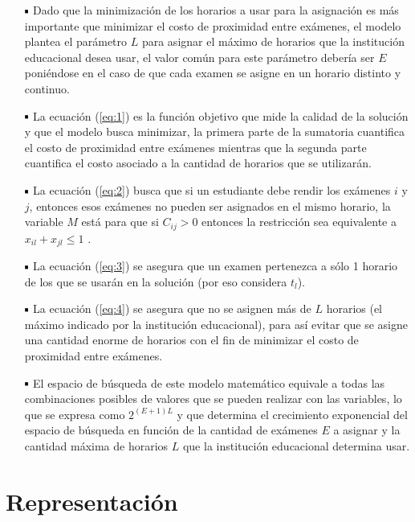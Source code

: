 \documentclass[letter, 10pt]{article}
\newcommand*\sq{\mathbin{\vcenter{\hbox{\rule{.7ex}{.7ex}}}}}
\begin{document}
\begin{itemize}
	\item[$\sq$] Dado que la minimización de los horarios a usar para la asignación es más importante que minimizar el costo de proximidad entre exámenes, el modelo plantea el parámetro $L$ para asignar el máximo de horarios que la institución educacional desea usar, el valor común para este parámetro debería ser $E$ poniéndose en el caso de que cada examen se asigne en un horario distinto y continuo.

	\item[$\sq$] La ecuación (\ref{eq:1}) es la función objetivo que mide la calidad de la solución y que el modelo busca minimizar, la primera parte de la sumatoria cuantifica el costo de proximidad entre exámenes mientras que la segunda parte cuantifica el costo asociado a la cantidad de horarios que se utilizarán.
	
	\item[$\sq$] La ecuación (\ref{eq:2}) busca que si un estudiante debe rendir los exámenes $i$ y $j$, entonces esos exámenes no pueden ser asignados en el mismo horario, la variable $M$ está para que si $C_{ij} > 0$ entonces la restricción sea equivalente a $x_{il} + x_{jl} \leq 1$ \cite{LAPORTE1984351}.

	\item[$\sq$] La ecuación (\ref{eq:3}) se asegura que un examen pertenezca a sólo 1 horario de los que se usarán en la solución (por eso considera $t_{l}$).

	\item[$\sq$] La ecuación (\ref{eq:4}) se asegura que no se asignen más de $L$ horarios (el máximo indicado por la institución educacional), para así evitar que se asigne una cantidad enorme de horarios con el fin de minimizar el costo de proximidad entre exámenes.

	\item[$\sq$] El espacio de búsqueda de este modelo matemático equivale a todas las combinaciones posibles de valores que se pueden realizar con las variables, lo que se expresa como $2^{(E + 1)L}$ y que determina el crecimiento exponencial del espacio de búsqueda en función de la cantidad de exámenes $E$ a asignar y la cantidad máxima de horarios $L$ que la institución educacional determina usar.
\end{itemize}

\section{Representación} \label{representacion}
\end{document}
